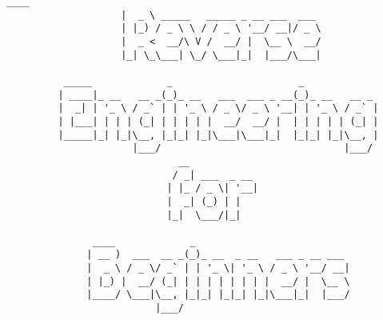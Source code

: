 \begin{center}
\vspace*{\fill}

\begin{center}
\begin{lstlisting}[basicstyle=\ttfamily\large,frame=none]
                     ____                                        
                    |  _ \ _____   _____ _ __ ___  ___           
                    | |_) / _ \ \ / / _ \ '__/ __|/ _ \          
                    |  _ <  __/\ V /  __/ |  \__ \  __/          
                    |_| \_\___| \_/ \___|_|  |___/\___|          
                                                                 
          _____             _                      _             
         | ____|_ __   __ _(_)_ __   ___  ___ _ __(_)_ __   __ _ 
         |  _| | '_ \ / _` | | '_ \ / _ \/ _ \ '__| | '_ \ / _` |
         | |___| | | | (_| | | | | |  __/  __/ |  | | | | | (_| |
         |_____|_| |_|\__, |_|_| |_|\___|\___|_|  |_|_| |_|\__, |
                      |___/                                |___/ 
                              __                                 
                             / _| ___  _ __                      
                            | |_ / _ \| '__|                     
                            |  _| (_) | |                        
                            |_|  \___/|_|                        
                                                                 
               ____             _                                
              | __ )  ___  __ _(_)_ __  _ __   ___ _ __ ___      
              |  _ \ / _ \/ _` | | '_ \| '_ \ / _ \ '__/ __|     
              | |_) |  __/ (_| | | | | | | | |  __/ |  \__ \     
              |____/ \___|\__, |_|_| |_|_| |_|\___|_|  |___/     
                          |___/                                  
\end{lstlisting}
\end{center}

\vspace*{\fill}
\end{center}
